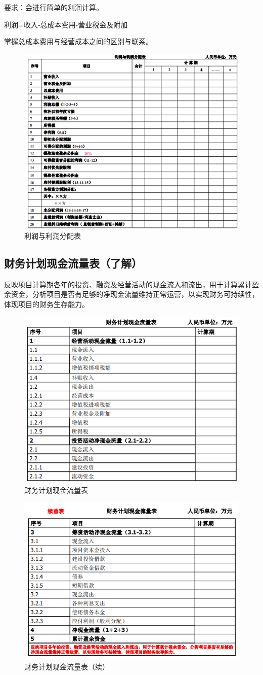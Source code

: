 要求：会进行简单的利润计算。

利润=收入-总成本费用-营业税金及附加

掌握总成本费用与经营成本之间的区别与联系。

\begin{figure}[H]
    \centering
    \includegraphics[width=0.6\linewidth]{image/利润与利润分配表.png}
    \caption{利润与利润分配表}
\end{figure}

\subsection{财务计划现金流量表（了解）}
反映项目计算期各年的投资、融资及经营活动的现金流入和流出，用于计算累计盈余资金，分析项目是否有足够的净现金流量维持正常运营，以实现财务可持续性，体现项目的财务生存能力。

\begin{figure}[H]
    \centering
    \includegraphics[width=0.6\linewidth]{image/财务计划现金流量表.png}
    \caption{财务计划现金流量表}
\end{figure}

\begin{figure}[H]
    \centering
    \includegraphics[width=0.6\linewidth]{image/财务计划现金流量表（续）.png}
    \caption{财务计划现金流量表（续）}
\end{figure}

